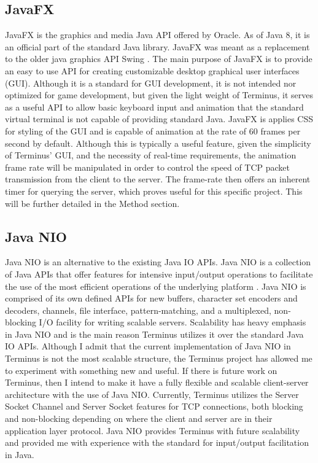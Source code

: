 \documentclass[12pt]{article}
\begin{document}
\subsection{JavaFX}
    JavaFX is the graphics and media Java API offered by Oracle. As of Java 8, it is an official part of the standard Java library. JavaFX was meant as a replacement to the older java graphics API Swing \cite{oracle}. The main purpose of JavaFX is to provide an easy to use API for creating customizable desktop graphical user interfaces (GUI). Although it is a standard for GUI development, it is not intended nor optimized for game development, but given the light weight of Terminus, it serves as a useful API to allow basic keyboard input and animation that the standard virtual terminal is not capable of providing standard Java. JavaFX is applies CSS for styling of the GUI and is capable of animation at the rate of 60 frames per second by default. Although this is typically a useful feature, given the simplicity of Terminus' GUI, and the necessity of real-time requirements, the animation frame rate will be manipulated in order to control the speed of TCP packet transmission from the client to the server. The frame-rate then offers an inherent timer for querying the server, which proves useful for this specific project. This will be further detailed in the Method section.

\subsection{Java NIO}
    Java NIO is an alternative to the existing Java IO APIs. Java NIO is a collection of Java APIs that offer features for intensive input/output operations to facilitate the use of the most efficient operations of the underlying platform \cite{nio}. Java NIO is comprised of its own defined APIs for new buffers, character set encoders and decoders, channels, file interface, pattern-matching, and a multiplexed, non-blocking I/O facility for writing scalable servers. Scalability has heavy emphasis in Java NIO and is the main reason Terminus utilizes it over the standard Java IO APIs. Although I admit that the current implementation of Java NIO in Terminus is not the most scalable structure, the Terminus project has allowed me to experiment with something new and useful. If there is future work on Terminus, then I intend to make it have a fully flexible and scalable client-server architecture with the use of Java NIO. Currently, Terminus utilizes the Server Socket Channel and Server Socket features for TCP connections, both blocking and non-blocking depending on where the client and server are in their application layer protocol. Java NIO provides Terminus with future scalability and provided me with experience with the standard for input/output facilitation in Java.
\end{document}
